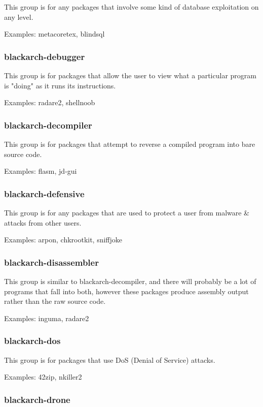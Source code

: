 \documentclass[a4paper, oneside, 11pt]{book}
\begin{document}
This group is for any packages that involve some kind of database exploitation on any level.

Examples: metacoretex, blindsql

\subsubsection{blackarch-debugger}

This group is for packages that allow the user to view what a particular program is "doing" as it runs its instructions.

Examples: radare2, shellnoob

\subsubsection{blackarch-decompiler}

This group is for packages that attempt to reverse a compiled program into bare source code.

Examples: flasm, jd-gui

\subsubsection{blackarch-defensive}

This group is for any packages that are used to protect a user from malware \& attacks from other users.

Examples: arpon, chkrootkit, sniffjoke

\subsubsection{blackarch-disassembler}

This group is similar to blackarch-decompiler, and there will probably be a lot of programs that fall into both, however these packages produce assembly output rather than the raw source code.

Examples: inguma, radare2

\subsubsection{blackarch-dos}

This group is for packages that use DoS (Denial of Service) attacks.

Examples: 42zip, nkiller2

\subsubsection{blackarch-drone}
\end{document}
